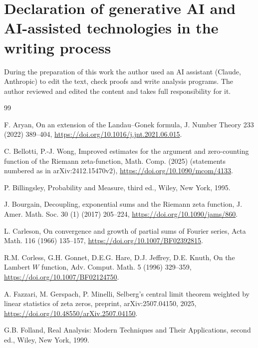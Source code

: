 \documentclass[preprint,12pt]{elsarticle}
\numberwithin{equation}{section}
\theoremstyle{plain}
\theoremstyle{definition}
\theoremstyle{remark}
\begin{document}
\section*{Declaration of generative AI and AI-assisted technologies in the writing process}
During the preparation of this work the author used an AI assistant (Claude, Anthropic) to edit the text, check proofs and write analysis programs. The author reviewed and edited the content and takes full responsibility for it.

\begin{thebibliography}{99}

F. Aryan, On an extension of the Landau--Gonek formula, J. Number Theory 233 (2022) 389--404, \href{https://doi.org/10.1016/j.jnt.2021.06.015}{https://doi.org/10.1016/j.jnt.2021.06.015}.

C. Bellotti, P.-J. Wong, Improved estimates for the argument and zero-counting function of the Riemann zeta-function, Math. Comp. (2025) (statements numbered as in arXiv:2412.15470v2), \href{https://doi.org/10.1090/mcom/4133}{https://doi.org/10.1090/mcom/4133}.

P. Billingsley, Probability and Measure, third ed., Wiley, New York, 1995.

J. Bourgain, Decoupling, exponential sums and the Riemann zeta function, J. Amer. Math. Soc. 30 (1) (2017) 205--224, \href{https://doi.org/10.1090/jams/860}{https://doi.org/10.1090/jams/860}.

L. Carleson, On convergence and growth of partial sums of Fourier series, Acta Math. 116 (1966) 135--157, \href{https://doi.org/10.1007/BF02392815}{https://doi.org/10.1007/BF02392815}.

R.M. Corless, G.H. Gonnet, D.E.G. Hare, D.J. Jeffrey, D.E. Knuth, On the Lambert $W$ function, Adv. Comput. Math. 5 (1996) 329--359, \href{https://doi.org/10.1007/BF02124750}{https://doi.org/10.1007/BF02124750}.

A. Fazzari, M. Gerspach, P. Minelli, Selberg's central limit theorem weighted by linear statistics of zeta zeros, preprint, arXiv:2507.04150, 2025, \href{https://doi.org/10.48550/arXiv.2507.04150}{https://doi.org/10.48550/arXiv.2507.04150}.

G.B. Folland, Real Analysis: Modern Techniques and Their Applications, second ed., Wiley, New York, 1999.


\end{thebibliography}
\end{document}

